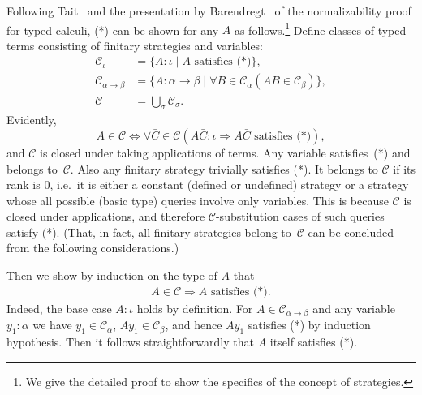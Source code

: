 \documentclass[fleqn]{LMCS}
\theoremstyle{plain}\newtheorem{satz}[thm]{Satz}
\theoremstyle{plain}\newtheorem{hyp}[thm]{Hypothesis}
\theoremstyle{plain}\newtheorem{hyps}[thm]{Hypotheses}
\theoremstyle{definition}\newtheorem{note}[thm]{Note}
\newcommand{\setof}[1]{\{#1\}}
\newcommand{\arr}{\rightarrow}
\newcommand{\Arr}{\Rightarrow}
\newcommand{\CC}{{\mathcal C}}
\newcommand{\?}{\mbox{?}}
\begin{document}
Following Tait~\cite{Tait67} and the presentation by Barendregt~\cite{Barendregt85} of 
the normalizability proof for typed calculi, 
(*) can be shown 
for any $A$ as follows.\footnote{We give the detailed proof to show the specifics of the concept of 
strategies.
}
Define classes of typed terms 
consisting of finitary strategies and variables:
\begin{align*}
\CC_\iota&=\setof{A:\iota\mid A \textrm{ satisfies (*)}}, \\
\CC_{\alpha\arr\beta}&=\setof{A:\alpha\arr\beta\mid\forall B\in 
\CC_\alpha(AB\in \CC_\beta)}, \\
\CC&=\bigcup_\sigma \CC_\sigma.
\end{align*}
Evidently, 
\[
A\in \CC\iff\forall \bar{C}\in \CC (A\bar{C}:\iota\Arr A\bar{C}\textrm{ satisfies (*)}),
\]
and $\CC$ is closed under taking applications of terms. 
Any variable satisfies~(*) and belongs to~$\CC$. 
Also any finitary strategy trivially satisfies (*).  
It belongs to $\CC$ if its rank is 0, i.e.\ it is either a constant 
(defined or undefined) strategy or a strategy whose all possible 
(basic type) queries involve only variables. This is because $\CC$ is closed under 
applications, and therefore $\CC$-substitution cases of such queries 
satisfy (*). 
(That, in fact, all finitary strategies belong to~$\CC$ 
can be concluded from the following considerations.) 

Then we show by induction on the type of $A$ that 
\begin{align}\label{eq:finitary-1}
A\in \CC
\Arr A\textrm{ satisfies (*)}. 
\end{align}
Indeed, the base case $A:\iota$ holds by definition. 
For $A\in \CC_{\alpha\arr\beta}$ and any variable $y_1:\alpha$ 
we have $y_1\in \CC_\alpha$, $Ay_1\in \CC_\beta$, 
and hence $Ay_1$ satisfies (*) by induction hypothesis. 
Then it follows straightforwardly that $A$ itself satisfies (*). 
\end{document}
